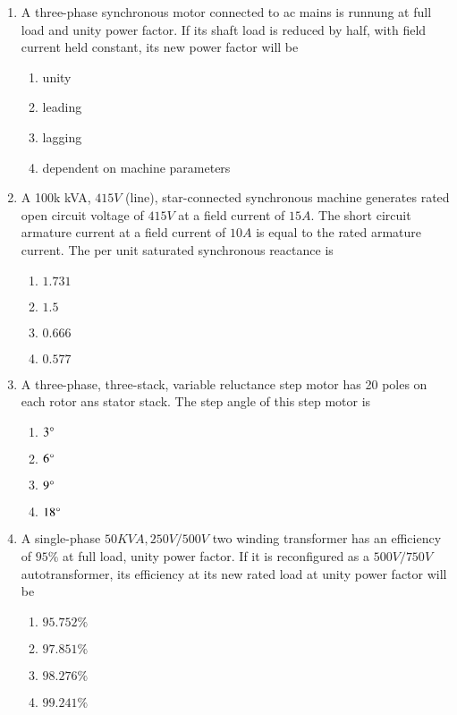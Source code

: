 \documentclass[journal,12pt,onecolumn]{IEEEtran}
\theoremstyle{remark}
\begin{document}
\begin{enumerate}
\item A three-phase synchronous motor connected to ac mains is runnung at full load and unity power factor. If its shaft load is reduced by half, with field current held constant, its new power factor will be 
\begin{enumerate}
    \item unity
    \item leading
    \item lagging 
    \item dependent on machine parameters \\
\end{enumerate} 

\item A 100k kVA, $415V$ (line), star-connected synchronous machine generates rated open circuit voltage of $415V$ at a field current of $15A$. The short circuit armature current at a field current of $10A$ is equal to the rated armature current. The per unit saturated synchronous reactance is
\begin{enumerate}
    \item $1.731$
    \item $1.5$
    \item $0.666$
    \item $0.577$
\end{enumerate}

\item A three-phase, three-stack, variable reluctance step motor has 20 poles on each rotor ans stator stack. The step angle of this step motor is
\begin{enumerate}
    \item $3 \degree$
    \item $6 \degree$
    \item $9 \degree$
    \item $18 \degree$\\
\end{enumerate}

\item A single-phase $50 KVA, 250V/500V$ two winding transformer has an efficiency of $95 \%$ at full load, unity power factor. If it is reconfigured as a $500V/750V$ autotransformer, its efficiency at its new rated load at unity power factor will be 
\begin{enumerate}
    \item $95.752\%$
    \item $97.851\%$
    \item $98.276\%$
    \item $99.241\%$\\
\end{enumerate}


\end{enumerate}
\end{document}
